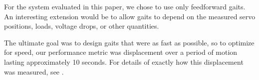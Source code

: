 
For the system evaluated in this paper, we chose to use only
feedforward gaits.  An interesting extension would be to allow gaits
to depend on the measured servo positions, loads, voltage drops, or
other quantities.

The ultimate goal was to design gaits that were as fast as possible,
so to optimize for speed, our performance metric was displacement over
a period of motion lasting approximately 10 seconds.  For details of
exactly how this displacement was measured, see
.
